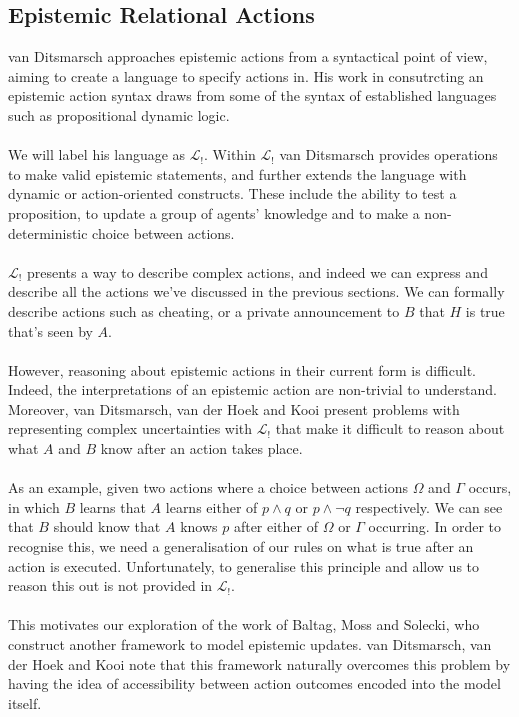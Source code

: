 \documentclass[12pt, a4paper, twoside]{article}
\begin{document}
\subsection{Epistemic Relational Actions} \label{epi_acts}
van Ditsmarsch approaches epistemic actions from a syntactical point of view,
aiming to create a language to specify actions in.
His work in consutrcting an epistemic action syntax draws from some of the
syntax of established languages such as propositional dynamic
logic.\citep{ditmarsch99knowledge,ditmarsch2002dga}\\
\\
We will label his language as $\mathcal{L}_{!}$.
Within $\mathcal{L}_{!}$ van Ditsmarsch provides operations to make valid
epistemic statements, and further extends the language with dynamic or
action-oriented constructs.
These include the ability to test a proposition, to update a group of agents'
knowledge and to make a non-deterministic choice between actions.\\
\\
$\mathcal{L}_{!}$ presents a way to describe complex actions, and indeed we can
express and describe all the actions we've discussed in the previous sections.
We can formally describe actions such as cheating, or a private
announcement to $B$ that $H$ is true that's seen by $A$.\\
\\
However, reasoning about epistemic actions in their current form is difficult.
Indeed, the interpretations of an epistemic action are non-trivial to
understand.
Moreover, van Ditsmarsch, van der Hoek and Kooi present problems with
representing complex uncertainties with $\mathcal{L}_{!}$ that make it difficult
to reason about what $A$ and $B$ know after an action takes place.\\
\\
As an example, given two actions where a choice between actions $\Omega$ and
$\Gamma$ occurs, in which $B$ learns that $A$ learns either of $p \land q$ or
$p \land \neg q$ respectively.
We can see that $B$ should know that $A$ knows $p$ after either of $\Omega$ or
$\Gamma$ occurring.
In order to recognise this, we need a generalisation of our rules on what is
true after an action is executed.
Unfortunately, to generalise this principle and allow us to reason this out is
not provided in $\mathcal{L}_{!}$.\citep{hoek2008dynamic}\\
\\
This motivates our exploration of the work of Baltag, Moss and Solecki, who construct
another framework to model epistemic updates.
van Ditsmarsch, van der Hoek and Kooi note that this framework naturally
overcomes this problem by having the idea of accessibility between action
outcomes encoded into the model itself.
\end{document}
